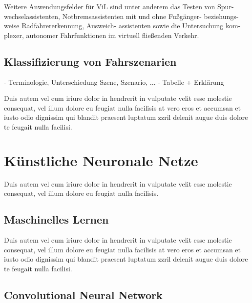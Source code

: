 Weitere Anwendungsfelder für ViL sind unter anderem das Testen von Spur- wechselassistenten, Notbremsassistenten mit und ohne Fußgänger- beziehungs- weise Radfahrererkennung, Ausweich- assistenten sowie die Untersuchung kom- plexer, autonomer Fahrfunktionen im virtuell fließenden Verkehr. \cite{schwab2014durchgangige}



\subsection{Klassifizierung von Fahrszenarien}
\label{grundlagen_fahren_szenarien}

- Terminologie, Unterschiedung Szene, Szenario, ...
- Tabelle + Erklärung

Duis autem vel eum iriure dolor in hendrerit in vulputate velit esse molestie consequat, vel illum dolore eu feugiat nulla facilisis at vero eros et accumsan et iusto odio dignissim qui blandit praesent luptatum zzril delenit augue duis dolore te feugait nulla facilisi.   


\section{Künstliche Neuronale Netze}
\label{grundlagen_nn}

Duis autem vel eum iriure dolor in hendrerit in vulputate velit esse molestie consequat, vel illum dolore eu feugiat nulla facilisis.


\subsection{Maschinelles Lernen}
\label{grundlagen_nn_ml}

Duis autem vel eum iriure dolor in hendrerit in vulputate velit esse molestie consequat, vel illum dolore eu feugiat nulla facilisis at vero eros et accumsan et iusto odio dignissim qui blandit praesent luptatum zzril delenit augue duis dolore te feugait nulla facilisi. 


\subsection{Convolutional Neural Network}
\label{grundlagen_nn_cnn}


